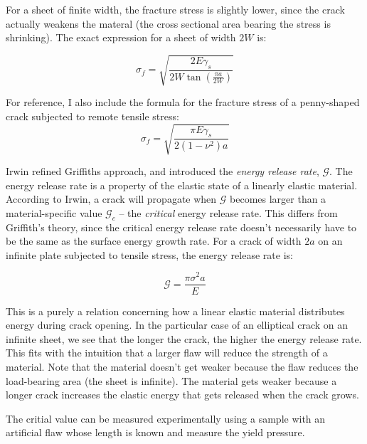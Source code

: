  For a sheet of finite width, the fracture stress is slightly lower, since the crack actually weakens the materal (the cross sectional area bearing the stress is shrinking). The exact expression for a sheet of width $2W$ is:

 \begin{equation}
 	\sigma_f = \sqrt{\frac{2E\gamma_s}{2W\tan\left( \frac{\pi a}{2W}\right)}}
 	\label{eq:griffith_finite_sheet}
 \end{equation}

For reference, I also include the formula for the fracture stress of a penny-shaped crack subjected to remote tensile stress:
\begin{equation}
	\sigma_f = \sqrt{\frac{\pi E \gamma_s }{2(1-\nu^2)a}}
\end{equation}
 


 Irwin refined Griffiths approach, and introduced the \emph{energy release rate}, $\mathcal{G}$. The energy release rate is a property of the elastic state of a linearly elastic material. According to Irwin, a crack will propagate when $\mathcal{G}$ becomes larger than a material-specific value $\mathcal{G}_c$ -- the \emph{critical} energy release rate. This differs from Griffith's theory, since the critical energy release rate doesn't necessarily have to be the same as the surface energy growth rate. For a crack of width $2a$ on an infinite plate subjected to tensile stress, the energy release rate is:

\begin{equation}
	\mathcal{G} = \frac{\pi \sigma^2 a}{E}
\end{equation}

This is a purely a relation concerning how a linear elastic material distributes energy during crack opening. In the particular case of an elliptical crack on an infinite sheet, we see that the longer the crack, the higher the energy release rate. This fits with the intuition that a larger flaw will reduce the strength of a material. Note that the material doesn't get weaker because the flaw reduces the load-bearing area (the sheet is infinite). The material gets weaker because a longer crack increases the elastic energy that gets released when the crack grows.

The critial value can be measured experimentally using a sample with an artificial flaw whose length is known and measure the yield pressure. 

